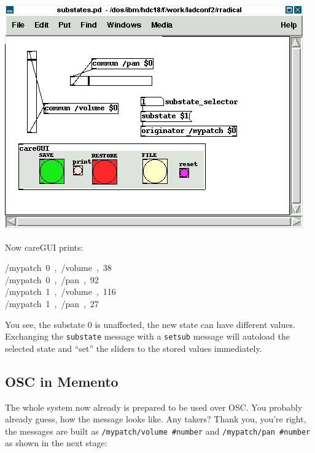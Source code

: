 \documentclass[10pt,english]{scrartcl}
\begin{document}
\includegraphics{substates.png}

Now careGUI prints:
\begin{ttfamily}\begin{flushleft}
\mbox{/mypatch~0~,~/volume~,~38}\\
\mbox{/mypatch~0~,~/pan~,~92}\\
\mbox{/mypatch~1~,~/volume~,~116}\\
\mbox{/mypatch~1~,~/pan~,~27}
\end{flushleft}\end{ttfamily}

You see, the substate 0 is unaffected, the new state can have different
values. Exchanging the \texttt{substate} message with a \texttt{setsub} message will
autoload the selected state and ``set'' the sliders to the stored values
immediately.



\hypertarget{osc-in-memento}{}
\subsection*{OSC in Memento}

The whole system now already is prepared to be used over OSC. You probably
already guess, how the message looks like. Any takers? Thank you, you're
right, the messages are built as \texttt{/mypatch/volume {\#}number} and
\texttt{/mypatch/pan {\#}number} as shown in the next stage:
\end{document}
